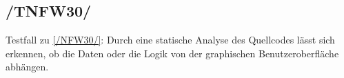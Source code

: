 \subsection*{/TNFW30/}

\label{/TNFW30/} Testfall zu \ref{/NFW30/}: Durch eine \gls{statische Analyse} des \Gls{Quellcode}s lässt sich erkennen, ob die Daten oder die Logik von der graphischen Benutzeroberfläche abhängen.